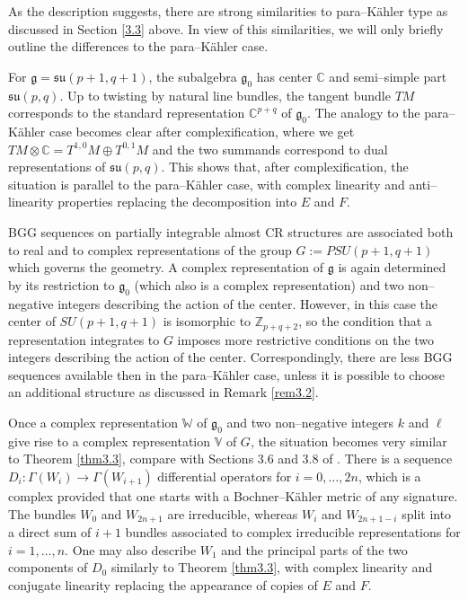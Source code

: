 \documentclass[12pt,a4paper]{amsart}
\def\frak{\mathfrak}
\def\Bbb{\mathbb}
\newcommand{\Ga}{\Gamma}
\numberwithin{theorem}{section}
\theoremstyle{definition}
\theoremstyle{remark}
\begin{document}
As the description suggests, there are strong similarities to
para--K\"ahler type as discussed in Section \ref{3.3} above. In view
of this similarities, we will only briefly outline the differences to
the para--K\"ahler case. 

For $\frak g=\frak{su}(p+1,q+1)$, the subalgebra $\frak g_0$ has
center $\Bbb C$ and semi--simple part $\frak{su}(p,q)$. Up to twisting
by natural line bundles, the tangent bundle $TM$ corresponds to the
standard representation $\Bbb C^{p+q}$ of $\frak g_0$. The analogy to
the para--K\"ahler case becomes clear after complexification, where we
get $TM\otimes\Bbb C=T^{1,0}M\oplus T^{0,1}M$ and the two summands
correspond to dual representations of $\frak{su}(p,q)$. This shows
that, after complexification, the situation is parallel to the
para--K\"ahler case, with complex linearity and anti--linearity
properties replacing the decomposition into $E$ and $F$.

BGG sequences on partially integrable almost CR structures are
associated both to real and to complex representations of the group
$G:=PSU(p+1,q+1)$ which governs the geometry. A complex representation
of $\frak g$ is again determined by its restriction to $\frak g_0$
(which also is a complex representation) and two non--negative
integers describing the action of the center. However, in this case
the center of $SU(p+1,q+1)$ is isomorphic to $\Bbb Z_{p+q+2}$, so the
condition that a representation integrates to $G$ imposes more
restrictive conditions on the two integers describing the action of
the center. Correspondingly, there are less BGG sequences available
then in the para--K\"ahler case, unless it is possible to choose an
additional structure as discussed in Remark \ref{rem3.2}.

Once a complex representation $\Bbb W$ of $\frak g_0$ and two
non--negative integers $k$ and $\ell$ give rise to a complex
representation $\Bbb V$ of $G$, the situation becomes very similar to
Theorem \ref{thm3.3}, compare with Sections 3.6 and 3.8 of
\cite{subcomplexes}. There is a sequence $D_i:\Ga(W_i)\to\Ga(W_{i+1})$
differential operators for $i=0,\dots,2n$, which is a complex provided
that one starts with a Bochner--K\"ahler metric of any signature. The
bundles $W_0$ and $W_{2n+1}$ are irreducible, whereas $W_i$ and
$W_{2n+1-i}$ split into a direct sum of $i+1$ bundles associated to
complex irreducible representations for $i=1,\dots,n$. One may also
describe $W_1$ and the principal parts of the two components of $D_0$
similarly to Theorem \ref{thm3.3}, with complex linearity and conjugate
linearity replacing the appearance of copies of $E$ and $F$.
\end{document}
